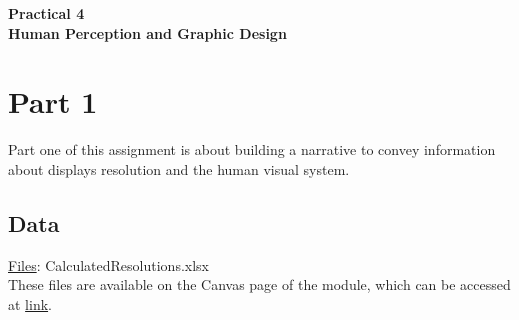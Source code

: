 \documentclass[11pt]{article}
\begin{document}
\pagestyle{fancy}
\renewcommand{\headrulewidth}{0pt}
\fancyfoot[L]{\thepage}
\fancyfoot[C]{}

\begin{center}
\vspace*{1cm}
{\textbf {\Huge Practical 4}}\\
\vspace*{0.5cm}
{\textbf {\huge Human Perception and Graphic Design}}
\vspace*{1cm}
\end{center}

\section{Part 1}

Part one of this assignment is about building a narrative to convey information about displays resolution and the human visual system.

\subsection*{Data}

\underline{Files}: CalculatedResolutions.xlsx\\
These files are available on the Canvas page of the module, which can be accessed at \href{https://ncl.instructure.com/courses/49730}{link}.\\
\end{document}

